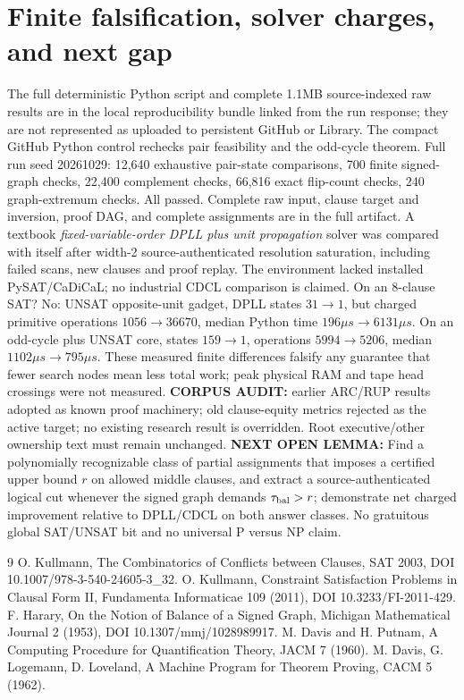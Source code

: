 \documentclass[10pt]{article}
\begin{document}
\section{Finite falsification, solver charges, and next gap}
The full deterministic Python script and complete 1.1MB source-indexed raw results are in the local reproducibility bundle linked from the run response; they are not represented as uploaded to persistent GitHub or Library. The compact GitHub Python control rechecks pair feasibility and the odd-cycle theorem. Full run seed 20261029: 12,640 exhaustive pair-state comparisons, 700 finite signed-graph checks, 22,400 complement checks, 66,816 exact flip-count checks, 240 graph-extremum checks. All passed. Complete raw input, clause target and inversion, proof DAG, and complete assignments are in the full artifact.
A textbook \emph{fixed-variable-order DPLL plus unit propagation} solver was compared with itself after width-2 source-authenticated resolution saturation, including failed scans, new clauses and proof replay. The environment lacked installed PySAT/CaDiCaL; no industrial CDCL comparison is claimed. On an 8-clause SAT? No: UNSAT opposite-unit gadget, DPLL states \(31\to1\), but charged primitive operations \(1056\to36670\), median Python time \(196\mu s\to6131\mu s\). On an odd-cycle plus UNSAT core, states \(159\to1\), operations \(5994\to5206\), median \(1102\mu s\to795\mu s\). These measured finite differences falsify any guarantee that fewer search nodes mean less total work; peak physical RAM and tape head crossings were not measured.
\textbf{CORPUS AUDIT:} earlier ARC/RUP results adopted as known proof machinery; old clause-equity metrics rejected as the active target; no existing research result is overridden. Root executive/other ownership text must remain unchanged.
\textbf{NEXT OPEN LEMMA:} Find a polynomially recognizable class of partial assignments that imposes a certified upper bound \(r\) on allowed middle clauses, and extract a source-authenticated logical cut whenever the signed graph demands \( \tau_{\rm bal}>r\); demonstrate net charged improvement relative to DPLL/CDCL on both answer classes. No gratuitous global SAT/UNSAT bit and no universal P versus NP claim.
\begin{thebibliography}{9}
 O. Kullmann, The Combinatorics of Conflicts between Clauses, SAT 2003, DOI 10.1007/978-3-540-24605-3\_32.
 O. Kullmann, Constraint Satisfaction Problems in Clausal Form II, Fundamenta Informaticae 109 (2011), DOI 10.3233/FI-2011-429.
 F. Harary, On the Notion of Balance of a Signed Graph, Michigan Mathematical Journal 2 (1953), DOI 10.1307/mmj/1028989917.
 M. Davis and H. Putnam, A Computing Procedure for Quantification Theory, JACM 7 (1960).
 M. Davis, G. Logemann, D. Loveland, A Machine Program for Theorem Proving, CACM 5 (1962).
\end{thebibliography}
\end{document}
